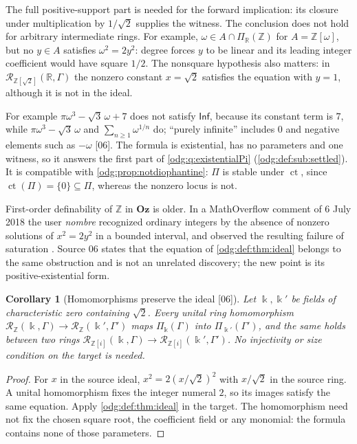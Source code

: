 \documentclass[11pt,oneside]{article}
\numberwithin{equation}{section}
\newtheorem{corollary}[corollary]{Corollary}
\theoremstyle{definition}
\theoremstyle{remark}
\newcommand{\Oz}{\mathbf{Oz}}
\newcommand{\Z}{\mathbb Z}
\newcommand{\R}{\mathbb R}
\newcommand{\ct}{\operatorname{ct}}
\newcommand{\src}[1]{\textup{\textsf{\small[#1]}}}
\begin{document}
The full positive-support part is needed for the forward implication:
its closure under multiplication by $1/\sqrt2$ supplies the witness.
The conclusion does not hold for arbitrary intermediate rings. For example,
$\omega\in A\cap\Pi_\R(\Z)$ for $A=\Z[\omega]$, but no $y\in A$ satisfies
$\omega^2=2y^2$: degree forces $y$ to be linear and its leading integer
coefficient would have square $1/2$. The nonsquare hypothesis also matters:
in $\mathcal R_{\Z[\sqrt2]}(\R,\Gamma)$ the nonzero constant $x=\sqrt2$
satisfies the equation with $y=1$, although it is not in the ideal.

For example $\pi\omega^3-\sqrt3\,\omega+7$ does not satisfy $\mathsf{Inf}$,
because its constant term is $7$, while $\pi\omega^3-\sqrt3\,\omega$ and
$\sum_{n\ge1}\omega^{1/n}$ do; ``purely infinite'' includes $0$ and negative
elements such as $-\omega$ \src{06}. The formula is existential, has no
parameters and one witness, so it answers the first part of
\cref{odg:q:existentialPi} (\cref{odg:def:sub:settled}). It is compatible with
\cref{odg:prop:notdiophantine}: $\Pi$ is stable under $\ct$, since
$\ct(\Pi)=\{0\}\subseteq\Pi$, whereas the nonzero locus is not.

First-order definability of $\Z$ in $\Oz$ is older. In a MathOverflow comment
of 6 July 2018 the user \emph{nombre} recognized ordinary integers by the
absence of nonzero solutions of $x^2=2y^2$ in a bounded interval, and observed
the resulting failure of saturation \cite{Nombre}. Source 06 states that the
equation of \cref{odg:def:thm:ideal} belongs to the same obstruction and is
not an unrelated discovery; the new point is its positive-existential form.

\begin{corollary}[Homomorphisms preserve the ideal \src{06}]\label{odg:def:cor:idealhom}
Let $\Bbbk,\Bbbk'$ be fields of characteristic zero containing $\sqrt2$. Every
unital ring homomorphism
$\mathcal R_\Z(\Bbbk,\Gamma)\to\mathcal R_\Z(\Bbbk',\Gamma')$ maps
$\Pi_\Bbbk(\Gamma)$ into $\Pi_{\Bbbk'}(\Gamma')$, and the same holds between
two rings $\mathcal R_{\Z[i]}(\Bbbk,\Gamma)\to\mathcal R_{\Z[i]}(\Bbbk',\Gamma')$.
No injectivity or size condition on the target is needed.
\end{corollary}
\begin{proof}
For $x$ in the source ideal, $x^2=2(x/\sqrt2)^2$ with $x/\sqrt2$ in the source
ring. A unital homomorphism fixes the integer numeral $2$, so its images
satisfy the same equation. Apply \cref{odg:def:thm:ideal} in the target.
The homomorphism need not fix the chosen square root, the coefficient field
or any monomial: the formula contains none of those parameters.
\end{proof}
\end{document}
